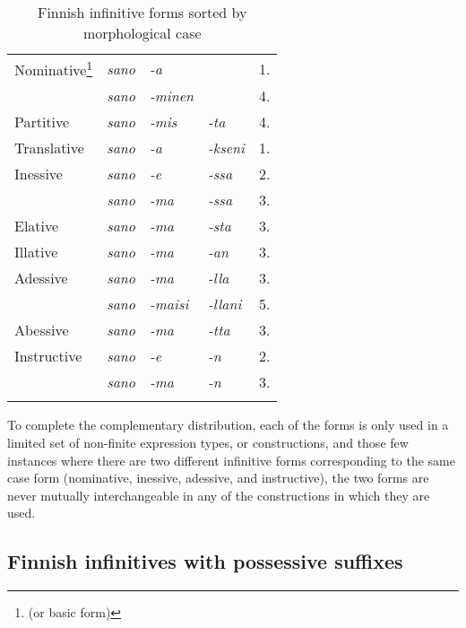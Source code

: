 \documentclass[output=paper, colorlinks,citecolor=brown]{langsci/langscibook}
\begin{document}
\begin{table}
    \caption{Finnish infinitive forms sorted by morphological case\label{tab:leino:3}}
    \begin{tabular}{lllll}
        \lsptoprule
            Nominative\footnote{(or basic form)} & \textit{sano} & \textit{-a} & & 1.\\
                                     & \textit{sano} & \textit{-minen} & & 4.\\
            Partitive & \textit{sano} & \textit{-mis} & \textit{-ta} & 4.\\
            Translative & \textit{sano} & \textit{-a} & \textit{-kseni} & 1.\\
            Inessive & \textit{sano} & \textit{-e} & \textit{-ssa} & 2.\\
                     & \textit{sano} & \textit{-ma} & \textit{-ssa} & 3.\\
            Elative & \textit{sano} & \textit{-ma} & \textit{-sta} & 3.\\
            Illative & \textit{sano} & \textit{-ma} & \textit{-an} & 3.\\
            Adessive & \textit{sano} & \textit{-ma} & \textit{-lla} & 3.\\
                     & \textit{sano} & \textit{-maisi} & \textit{-llani} & 5.\\
            Abessive & \textit{sano} & \textit{-ma} & \textit{-tta} & 3.\\
            Instructive & \textit{sano} & \textit{-e} & \textit{-n} & 2.\\
                    & \textit{sano} & \textit{-ma} & \textit{-n} & 3.\\
        \lspbottomrule 
    \end{tabular}
\end{table}

To complete the complementary distribution, each of the forms is only used in a limited set of non-finite expression types, or constructions, and those few instances where there are two different infinitive forms corresponding to the same case form (nominative, inessive, adessive, and instructive), the two forms are never mutually interchangeable in any of the constructions in which they are used.

\subsection{Finnish infinitives with possessive suffixes}\label{sec:leino_4.4}
\end{document}
